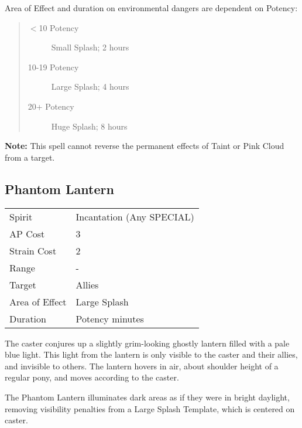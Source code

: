 \documentclass[11pt,a4paper,twocolumn]{book}
\begin{document}
Area of Effect and duration on environmental dangers are dependent on Potency:

\begin{quote}
	\begin{description}
		\item[$<$10 Potency] 	Small Splash; 2 hours
		\item[10-19 Potency] 	Large Splash; 4 hours
		\item[20+ Potency]  	Huge Splash; 8 hours
	\end{description}	
\end{quote}

\textbf{Note:} This spell cannot reverse the permanent effects of Taint or Pink Cloud from a target.

\subsection*{Phantom Lantern}
{
	\begin{tabu} to 75mm{| X[l,4] | X[l,7] |}
		\hline
		Spirit         & Incantation (Any SPECIAL) \\
		AP Cost        & 3                         \\
		Strain Cost    & 2                         \\
		Range          & -                         \\
		Target         & Allies                    \\
		Area of Effect & Large Splash              \\
		Duration       & Potency minutes           \\ \hline
	\end{tabu}
	
}

\medskip

The caster conjures up a slightly grim-looking ghostly lantern filled with a pale blue light. This light from the lantern is only visible to the caster and their allies, and invisible to others. The lantern hovers in air, about shoulder height of a regular pony, and moves according to the caster.

The Phantom Lantern illuminates dark areas as if they were in bright daylight, removing visibility penalties from a Large Splash Template, which is centered on caster.
\end{document}

